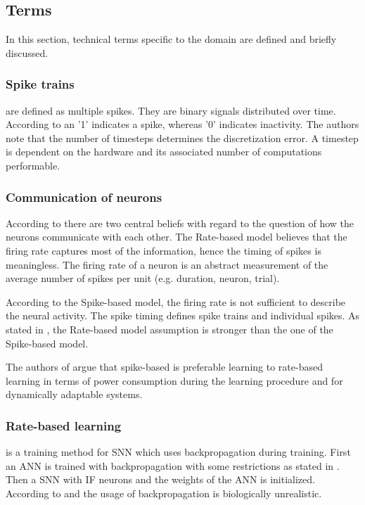 \newcommand\rbModel{Rate-based model}
\newcommand\sbModel{Spike-based model}
\subsection{Terms}
\label{subsec:terms}

In this section, technical terms specific to the domain are defined and briefly discussed.

\subsubsection{Spike trains}
are defined as multiple spikes.
They are binary signals distributed over time.
According to \cite{DIET_SNN} an '1' indicates a spike, whereas '0' indicates inactivity.
The authors note that the number of timesteps determines the discretization error.
A timestep is dependent on the hardware and its associated number of computations performable.

\subsubsection{Communication of neurons}
\label{subsubsec:communication}
According to \cite{spike_vs_rate} there are two central beliefs with regard to the question of how the neurons communicate with each other.
The \rbModel{} believes that the firing rate captures most of the information, hence the timing of spikes is meaningless.
The firing rate of a neuron is an abstract measurement of the average number of spikes per unit (e.g. duration, neuron, trial).

According to the \sbModel{}, the firing rate is not sufficient to describe the neural activity.
The spike timing defines spike trains and individual spikes.
As stated in \cite{spike_vs_rate}, the \rbModel{} assumption is stronger than the one of the \sbModel{}.

The authors of \cite{SNN} argue that spike-based is preferable learning to rate-based learning in terms of power consumption 
during the learning procedure and for dynamically adaptable systems.


\subsubsection{Rate-based learning} is a training method for \ac{SNN} which uses backpropagation during training. 
First an \ac{ANN} is trained with backpropagation with some restrictions as stated in \cite{DIET_SNN}.
Then a \ac{SNN} with \ac{IF} neurons and the weights of the \ac{ANN} is initialized.
According to \cite{SNN} and \cite{STDP_like} the usage of backpropagation is biologically unrealistic.
